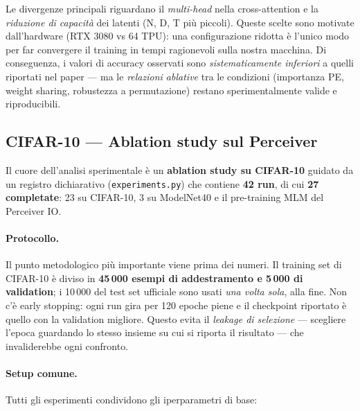 \documentclass[
  11pt,
]{article}
\begin{document}
\begin{notabox}[title={\textbf{Implicazioni delle divergenze}}]
Le divergenze principali riguardano il \emph{multi-head} nella cross-attention e la \emph{riduzione di capacità} dei latenti (N, D, T più piccoli). Queste scelte sono motivate dall'hardware (RTX 3080 vs 64 TPU): una configurazione ridotta è l'unico modo per far convergere il training in tempi ragionevoli sulla nostra macchina. Di conseguenza, i valori di accuracy osservati sono \emph{sistematicamente inferiori} a quelli riportati nel paper --- ma le \emph{relazioni ablative} tra le condizioni (importanza PE, weight sharing, robustezza a permutazione) restano sperimentalmente valide e riproducibili.
\end{notabox}

\subsection{CIFAR-10 --- Ablation study sul Perceiver}
\label{sec:progetto-cifar10}

Il cuore dell'analisi sperimentale è un \textbf{ablation study su CIFAR-10} guidato da un registro dichiarativo (\texttt{experiments.py}) che contiene \textbf{42 run}, di cui \textbf{27 completate}: 23 su CIFAR-10, 3 su ModelNet40 e il pre-training MLM del Perceiver IO.

\paragraph{Protocollo.} Il punto metodologico più importante viene prima dei numeri. Il training set di CIFAR-10 è diviso in \textbf{45\,000 esempi di addestramento e 5\,000 di validation}; i 10\,000 del test set ufficiale sono usati \emph{una volta sola}, alla fine. Non c'è early stopping: ogni run gira per 120 epoche piene e il checkpoint riportato è quello con la validation migliore. Questo evita il \emph{leakage di selezione} --- scegliere l'epoca guardando lo stesso insieme su cui si riporta il risultato --- che invaliderebbe ogni confronto.

\paragraph{Setup comune.} Tutti gli esperimenti condividono gli iperparametri di base:
\end{document}
